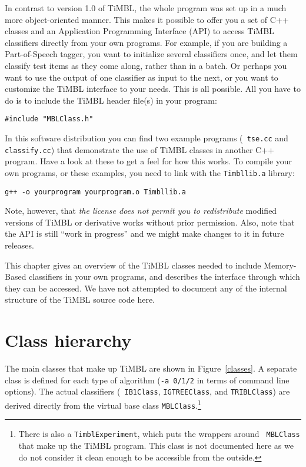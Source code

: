 \documentclass{report}
\begin{document}
In contrast to version 1.0 of TiMBL, the whole program was set up in a
much more object-oriented manner. This makes it possible to offer you
a set of C++ classes and an Application Programming Interface (API) to
access TiMBL classifiers directly from your own programs. For example,
if you are building a Part-of-Speech tagger, you want to initialize
several classifiers once, and let them classify test items as they
come along, rather than in a batch. Or perhaps you want to use the
output of one classifier as input to the next, or you want to
customize the TiMBL interface to your needs. This is all possible. All
you have to do is to include the TiMBL header file(s) in your program:

\begin{verbatim}
#include "MBLClass.h"
\end{verbatim}

\noindent
In this software distribution you can find two example programs ({\tt
tse.cc} and {\tt classify.cc}) that demonstrate the use of TiMBL
classes in another C++ program. Have a look at these to get a feel for
how this works. To compile your own programs, or these examples, you
need to link with the {\tt Timbllib.a} library:

\begin{verbatim}
g++ -o yourprogram yourprogram.o Timbllib.a
\end{verbatim}

\noindent
Note, however, that {\em the license does not permit you to redistribute}
modified versions of TiMBL or derivative works without prior
permission. Also, note that the API is still ``work in progress'' and
we might make changes to it in future releases.

This chapter gives an overview of the TiMBL classes needed to include
Memory-Based classifiers in your own programs, and describes the
interface through which they can be accessed. We have not attempted to
document any of the internal structure of the TiMBL source code here.

\section{Class hierarchy}
\label{classhierarchsection}

The main classes that make up TiMBL are shown in Figure~\ref{classes}.
A separate class is defined for each type of algorithm ({\tt -a 0/1/2}
in terms of command line options). The actual classifiers ({\tt
IB1Class}, {\tt IGTREEClass}, and {\tt TRIBLClass}) are derived
directly from the virtual base class {\tt MBLClass}.\footnote{There is
also a {\tt TimblExperiment}, which puts the wrappers around {\tt
MBLClass} that make up the TiMBL program. This class is not documented
here as we do not consider it clean enough to be accessible from the
outside.}
\end{document}
